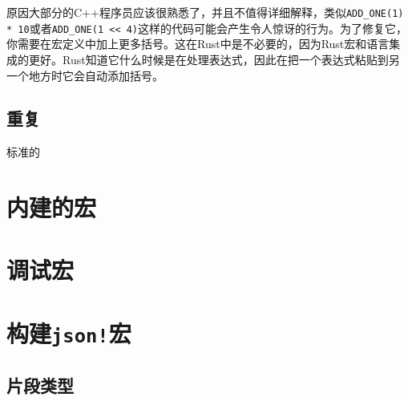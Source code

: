 原因大部分的C++程序员应该很熟悉了，并且不值得详细解释，类似\texttt{ADD\_ONE(1) * 10}或者\texttt{ADD\_ONE(1 << 4)}这样的代码可能会产生令人惊讶的行为。为了修复它，你需要在宏定义中加上更多括号。这在Rust中是不必要的，因为Rust宏和语言集成的更好。Rust知道它什么时候是在处理表达式，因此在把一个表达式粘贴到另一个地方时它会自动添加括号。

\subsection{重复}
标准的

\section{内建的宏}


\section{调试宏}\label{DebugMacro}


\section{构建\texttt{json!}宏}


\subsection{片段类型}\label{FragType}

